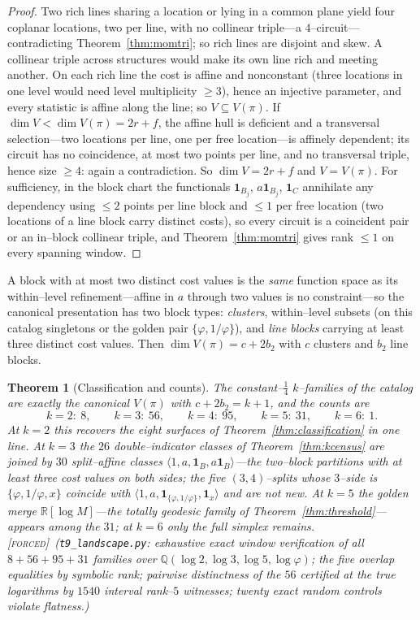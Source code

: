 \documentclass[11pt]{article}
\newtheorem{theorem}{Theorem}[section]
\theoremstyle{definition}
\newcommand{\ph}{\varphi}
\newcommand{\Q}{\mathbb{Q}}
\newcommand{\R}{\mathbb{R}}
\newcommand{\forcedtag}{{\scshape [forced]}}
\begin{document}
\begin{proof}
Two rich lines sharing a location or lying in a common plane yield four coplanar locations, two
per line, with no collinear triple---a $4$--circuit---contradicting Theorem~\ref{thm:momtri}; so
rich lines are disjoint and skew. A collinear triple across structures would make its own line
rich and meeting another. On each rich line the cost is affine and nonconstant (three locations
in one level would need level multiplicity $\ge3$), hence an injective parameter, and every
statistic is affine along the line; so $V\subseteq V(\pi)$. If $\dim V<\dim V(\pi)=2r+f$, the
affine hull is deficient and a transversal selection---two locations per line, one per free
location---is affinely dependent; its circuit has no coincidence, at most two points per line,
and no transversal triple, hence size $\ge4$: again a contradiction. So $\dim V=2r+f$ and
$V=V(\pi)$. For sufficiency, in the block chart the functionals $\mathbf 1_{B_j}$,
$a\mathbf 1_{B_j}$, $\mathbf 1_{C}$ annihilate any dependency using $\le2$ points per line block
and $\le1$ per free location (two locations of a line block carry distinct costs), so every
circuit is a coincident pair or an in--block collinear triple, and Theorem~\ref{thm:momtri}
gives rank $\le1$ on every spanning window.
\end{proof}

A block with at most two distinct cost values is the \emph{same} function space as its
within--level refinement---affine in $a$ through two values is no constraint---so the canonical
presentation has two block types: \emph{clusters}, within--level subsets (on this catalog
singletons or the golden pair $\{\ph,1/\ph\}$), and \emph{line blocks} carrying at least three
distinct cost values. Then $\dim V(\pi)=c+2b_2$ with $c$ clusters and $b_2$ line blocks.

\begin{theorem}[Classification and counts]\label{thm:paclass}
The constant--$\tfrac14$ $k$--families of the catalog are exactly the canonical $V(\pi)$ with
$c+2b_2=k+1$, and the counts are
\[
k=2{:}\ 8,\qquad k=3{:}\ 56,\qquad k=4{:}\ 95,\qquad k=5{:}\ 31,\qquad k=6{:}\ 1 .
\]
At $k=2$ this recovers the eight surfaces of Theorem~\ref{thm:classification} in one line. At
$k=3$ the $26$ double--indicator classes of Theorem~\ref{thm:kcensus} are joined by $30$
\emph{split--affine} classes $\langle 1,a,\mathbf 1_B,a\mathbf 1_B\rangle$---the two--block
partitions with at least three cost values on both sides; the five $(3,4)$--splits whose
$3$--side is $\{\ph,1/\ph,x\}$ coincide with $\langle1,a,\mathbf 1_{\{\ph,1/\ph\}},\mathbf
1_x\rangle$ and are not new. At $k=5$ the golden merge $\R[\log M]$---the totally geodesic
family of Theorem~\ref{thm:threshold}---appears among the $31$; at $k=6$ only the full simplex
remains. \forcedtag\ (\texttt{t9\_landscape.py}: exhaustive exact window verification of all
$8+56+95+31$ families over $\Q(\log2,\log3,\log5,\log\ph)$; the five overlap equalities by
symbolic rank; pairwise distinctness of the $56$ certified at the true logarithms by $1540$
interval rank--$5$ witnesses; twenty exact random controls violate flatness.)
\end{theorem}
\end{document}
